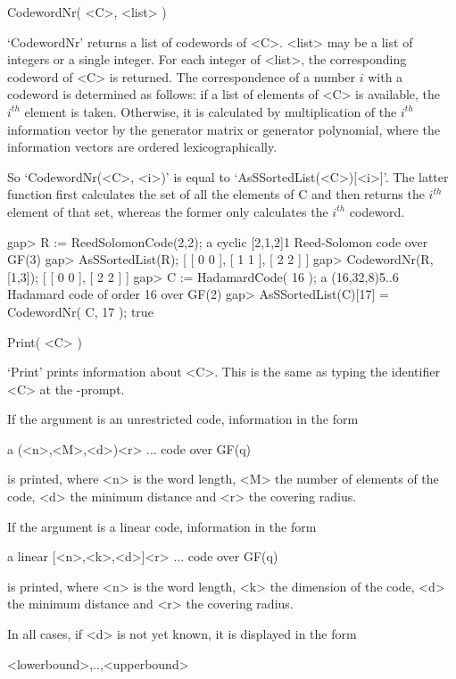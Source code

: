 \>CodewordNr( <C>, <list> )

`CodewordNr' returns a list of codewords of <C>. <list> may  be a list of
integers    or a single   integer.   For   each  integer  of  <list>, the
corresponding codeword of <C> is returned. The correspondence of a number
$i$ with a codeword is determined as follows: if  a list of elements of
<C>  is  available,  the $i^{th}$ element   is  taken.  Otherwise,  it is
calculated by multiplication of   the $i^{th}$ information vector  by the
generator matrix or generator  polynomial, where the  information vectors
are ordered lexicographically.

So `CodewordNr(<C>, <i>)' is  equal to `AsSSortedList(<C>)[<i>]'.   The latter
function first   calculates the set  of all  the elements  of  C and then
returns the  $i^{th}$ element  of    that set, whereas the  former   only
calculates the $i^{th}$ codeword.

\beginexample
gap> R := ReedSolomonCode(2,2);
a cyclic [2,1,2]1 Reed-Solomon code over GF(3)
gap> AsSSortedList(R);
[ [ 0 0 ], [ 1 1 ], [ 2 2 ] ]
gap> CodewordNr(R, [1,3]);
[ [ 0 0 ], [ 2 2 ] ]
gap> C := HadamardCode( 16 );
a (16,32,8)5..6 Hadamard code of order 16 over GF(2)
gap> AsSSortedList(C)[17] = CodewordNr( C, 17 );
true 
\endexample


\>Print( <C> )

`Print' prints information  about <C>.  This is the   same as typing  the
identifier <C> at the {\GAP}-prompt.

If the argument is an unrestricted code, information in the form

\begintt
a (<n>,<M>,<d>)<r> ... code over GF(q)
\endtt

is printed, where <n> is the word length, <M> the number of elements of
the code, <d> the minimum distance and <r> the covering radius.

If the argument is a linear code, information in the form

\begintt
a linear [<n>,<k>,<d>]<r> ... code over GF(q)
\endtt

is printed, where <n> is the word length, <k> the dimension of the code,
<d> the minimum distance and <r> the covering radius.

In all cases, if <d> is not yet known, it is displayed in the form

\begintt
<lowerbound>,..,<upperbound>
\endtt

